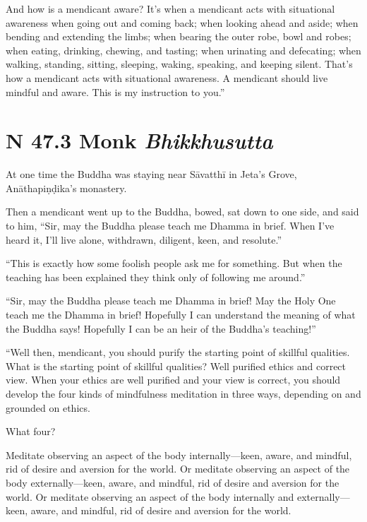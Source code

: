 \documentclass[12pt,openany]{book}%
\newcommand*{\suttatitleacronym}[1]{\smaller[2]{#1}\vspace*{.3em}}
\newcommand*{\suttatitletranslation}[1]{\linebreak{#1}}
\newcommand*{\suttatitleroot}[1]{\linebreak\smaller[2]\itshape{#1}}
\newcommand*{\tocacronym}[1]{\hspace*{-3.3em}{#1}\quad}
\newcommand*{\toctranslation}[1]{#1}
\newcommand*{\tocroot}[1]{(\textit{#1})}
\begin{document}
And how is a mendicant aware? It’s when a mendicant acts with situational awareness when going out and coming back; when looking ahead and aside; when bending and extending the limbs; when bearing the outer robe, bowl and robes; when eating, drinking, chewing, and tasting; when urinating and defecating; when walking, standing, sitting, sleeping, waking, speaking, and keeping silent. That’s how a mendicant acts with situational awareness. A mendicant should live mindful and aware. This is my instruction to you.” 

%
\section*{{\suttatitleacronym SN 47.3}{\suttatitletranslation A Monk }{\suttatitleroot Bhikkhusutta}}
\addcontentsline{toc}{section}{\tocacronym{SN 47.3} \toctranslation{A Monk } \tocroot{Bhikkhusutta}}

At one time the Buddha was staying near \textsanskrit{Sāvatthī} in Jeta’s Grove, \textsanskrit{Anāthapiṇḍika}’s monastery. 

Then a mendicant went up to the Buddha, bowed, sat down to one side, and said to him, “Sir, may the Buddha please teach me Dhamma in brief. When I’ve heard it, I’ll live alone, withdrawn, diligent, keen, and resolute.” 

“This is exactly how some foolish people ask me for something. But when the teaching has been explained they think only of following me around.” 

“Sir, may the Buddha please teach me Dhamma in brief! May the Holy One teach me the Dhamma in brief! Hopefully I can understand the meaning of what the Buddha says! Hopefully I can be an heir of the Buddha’s teaching!” 

“Well then, mendicant, you should purify the starting point of skillful qualities. What is the starting point of skillful qualities? Well purified ethics and correct view. When your ethics are well purified and your view is correct, you should develop the four kinds of mindfulness meditation in three ways, depending on and grounded on ethics. 

What four? 

Meditate observing an aspect of the body internally—keen, aware, and mindful, rid of desire and aversion for the world. Or meditate observing an aspect of the body externally—keen, aware, and mindful, rid of desire and aversion for the world. Or meditate observing an aspect of the body internally and externally—keen, aware, and mindful, rid of desire and aversion for the world. 
\end{document}
